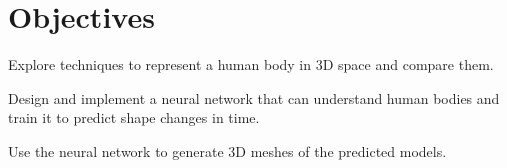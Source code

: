 
\chapter{Objectives}\label{objectives}

Explore techniques to represent a human body in 3D space and compare them.

Design and implement a neural network that can understand human bodies and
train it to predict shape changes in time.

Use the neural network to generate 3D meshes of the predicted models.